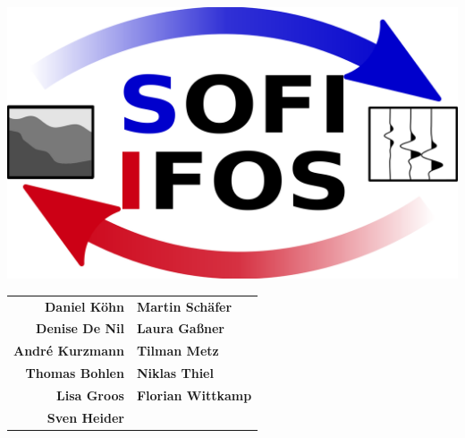 \begin{center}
\includegraphics[width=.7\textwidth]{figures/logo_SOFI_IFOS.png}

\vspace{0.2\textwidth}

\begin{tabular}{rl}
\textbf{Daniel K\"ohn} & \textbf{Martin Sch\"afer}\\
\textbf{Denise De Nil} & \textbf{Laura Ga\ss ner}\\
\textbf{Andr\'{e} Kurzmann} & \textbf{Tilman Metz}\\
\textbf{Thomas Bohlen} & \textbf{Niklas Thiel}\\
\textbf{Lisa Groos} & \textbf{Florian Wittkamp}\\
\textbf{Sven Heider} & \\
\end{tabular}

\end{center}
\rmfamily